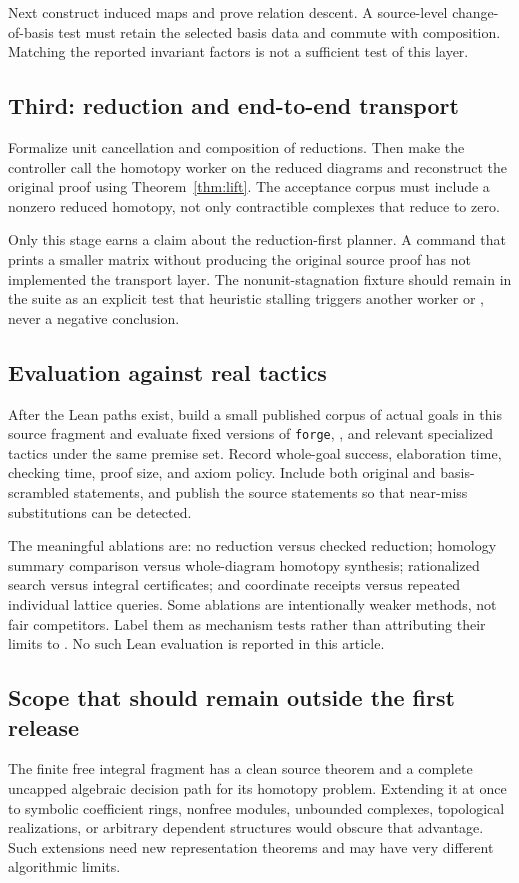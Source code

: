 \documentclass[11pt,letterpaper]{article}
\theoremstyle{definition}\newtheorem{definition}[theorem]{Definition}
\theoremstyle{remark}\newtheorem{remark}[theorem]{Remark}
\newcommand{\forge}{\texttt{forge}}
\newcommand{\code}[1]{\texttt{\detokenize{#1}}}
\begin{document}
Next construct induced maps and prove relation descent. A source-level
change-of-basis test must retain the selected basis data and commute with
composition. Matching the reported invariant factors is not a sufficient test
of this layer.

\subsection{Third: reduction and end-to-end transport}
Formalize unit cancellation and composition of reductions. Then make the
controller call the homotopy worker on the reduced diagrams and reconstruct the
original proof using Theorem~\ref{thm:lift}. The acceptance corpus must include a
nonzero reduced homotopy, not only contractible complexes that reduce to zero.

Only this stage earns a claim about the reduction-first planner. A command
that prints a smaller matrix without producing the original source proof has
not implemented the transport layer. The nonunit-stagnation fixture should
remain in the suite as an explicit test that heuristic stalling triggers
another worker or \code{UNKNOWN}, never a negative conclusion.

\subsection{Evaluation against real tactics}
After the Lean paths exist, build a small published corpus of actual goals in
this source fragment and evaluate fixed versions of \forge{}, \code{grind},
and relevant specialized tactics under the same premise set. Record whole-goal
success, elaboration time, checking time, proof size, and axiom policy.
Include both original and basis-scrambled statements, and publish the source
statements so that near-miss substitutions can be detected.

The meaningful ablations are: no reduction versus checked reduction; homology
summary comparison versus whole-diagram homotopy synthesis; rationalized search
versus integral certificates; and coordinate receipts versus repeated individual
lattice queries. Some ablations are intentionally weaker methods, not fair
competitors. Label them as mechanism tests rather than attributing their limits
to \code{grind}. No such Lean evaluation is reported in this article.

\subsection{Scope that should remain outside the first release}
The finite free integral fragment has a clean source theorem and a complete
uncapped algebraic decision path for its homotopy problem. Extending it at once
to symbolic coefficient rings, nonfree modules, unbounded complexes,
topological realizations, or arbitrary dependent structures would obscure that
advantage. Such extensions need new representation theorems and may have very
different algorithmic limits.
\end{document}
